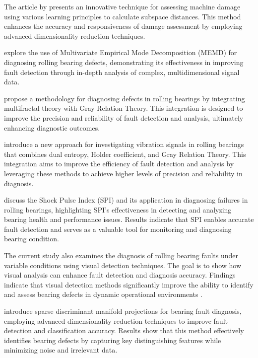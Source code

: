 \documentclass[sn-basic,pdflatex]{sn-jnl}
\theoremstyle{remark}
\theoremstyle{definition}
\begin{document}
The article by \citet{WOS:000366765500038} presents an innovative
technique for assessing machine damage using various learning principles
to calculate subspace distances. This method enhances the accuracy and
responsiveness of damage assessment by employing advanced dimensionality
reduction techniques.

\citet{WOS:000379556300014} explore the use of Multivariate Empirical
Mode Decomposition (MEMD) for diagnosing rolling bearing defects,
demonstrating its effectiveness in improving fault detection through
in-depth analysis of complex, multidimensional signal data.

\citet{WOS:000391229300006} propose a methodology for diagnosing defects
in rolling bearings by integrating multifractal theory with Gray
Relation Theory. This integration is designed to improve the precision
and reliability of fault detection and analysis, ultimately enhancing
diagnostic outcomes.

\citet{WOS:000426819400027} introduce a new approach for investigating
vibration signals in rolling bearings that combines dual entropy, Holder
coefficient, and Gray Relation Theory. This integration aims to improve
the efficiency of fault detection and analysis by leveraging these
methods to achieve higher levels of precision and reliability in
diagnosis.

\citet{WOS:000398818700108} discuss the Shock Pulse Index (SPI) and its
application in diagnosing failures in rolling bearings, highlighting
SPI's effectiveness in detecting and analyzing bearing health and
performance issues. Results indicate that SPI enables accurate fault
detection and serves as a valuable tool for monitoring and diagnosing
bearing condition.

The current study also examines the diagnosis of rolling bearing faults
under variable conditions using visual detection techniques. The goal is
to show how visual analysis can enhance fault detection and diagnosis
accuracy. Findings indicate that visual detection methods significantly
improve the ability to identify and assess bearing defects in dynamic
operational environments \citep{WOS:000404415000016}.

\citet{WOS:000401109400020} introduce sparse discriminant manifold
projections for bearing fault diagnosis, employing advanced
dimensionality reduction techniques to improve fault detection and
classification accuracy. Results show that this method effectively
identifies bearing defects by capturing key distinguishing features
while minimizing noise and irrelevant data.
\end{document}
